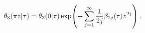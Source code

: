 \[\mathop{\theta_{3}\/}\nolimits\!\left(\pi z\middle|\tau\right)=\mathop{\theta_%
{3}\/}\nolimits\!\left(0\middle|\tau\right)\mathop{\exp\/}\nolimits\!\left(-%
\sum_{j=1}^{\infty}\frac{1}{2j}\beta_{2j}(\tau)z^{2j}\right),\]